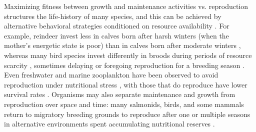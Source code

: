 \documentclass{pnastwo}
\begin{document}
\begin{article}
Maximizing fitness between growth and maintenance activities vs. reproduction structures the life-history of many species, and this can be achieved by alternative behavioral strategies conditioned on resource availability \cite{Morris:1987eo}.
For example, reindeer invest less in calves born after harsh winters (when the mother's energetic state is poor) than in calves born after moderate winters \cite{Tveraa:2003fq}, whereas many bird species invest differently in broods during periods of resource scarcity \cite{Daan:1988va,Jacot:2009dv}, sometimes delaying or foregoing reproduction for a breeding season \cite{Martin:1987dl,Stearns:1989ip,Barboza:2002in}.
Even freshwater and marine zooplankton have been observed to avoid reproduction under nutritional stress \cite{Threlkeld:1976ih}, with those that do reproduce have lower survival rates \cite{Kirk:1997cc}. %
Organisms may also separate maintenance and growth from reproduction over space and time: 
many salmonids, birds, and some mammals return to migratory breeding grounds to reproduce after one or multiple seasons in alternative environments spent accumulating nutritional reserves \cite{Weber:1998jg,Mduma:1999cp,Moore:2014hi}.



\end{article}
\end{document}
